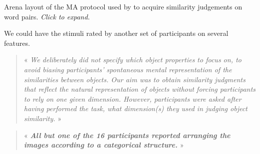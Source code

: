 \documentclass[
  authoryear]{elsarticle}
\begin{document}
\begin{marginfigure}


\caption{\label{fig-majewska}Arena layout of the MA protocol used by
\citet{majewskaSpatialMultiarrangementClustering2020} to acquire
similarity judgements on word pairs. \emph{Click to expand.}}

\end{marginfigure}%

We could have the stimuli rated by another set of participants on
several features.

\begin{quote}
« \emph{We deliberately did not specify which object properties to focus
on, to avoid biasing participants' spontaneous mental representation of
the similarities between objects. Our aim was to obtain similarity
judgments that reflect the natural representation of objects without
forcing participants to rely on one given dimension. However,
participants were asked after having performed the task, what
dimension(s) they used in judging object similarity.} »
\citep{jozwik2016}
\end{quote}

\begin{quote}
« \textbf{\emph{All but one of the 16 participants reported arranging
the images according to a categorical structure.}} » \citep{jozwik2017}
\end{quote}
\end{document}
